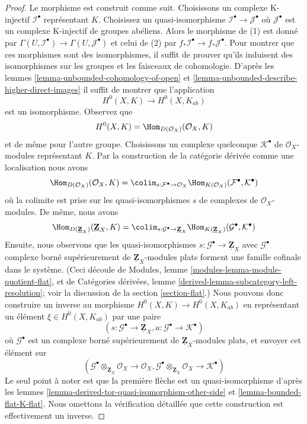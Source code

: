 \begin{proof}

Le morphisme est construit comme suit. Choisissons un complexe K-injectif
$\mathcal{I}^\bullet$ représentant $K$. Choisissez un quasi-isomorphisme
$\mathcal{I}^\bullet \to \mathcal{J}^\bullet$ où $\mathcal{J}^\bullet$
est un complexe K-injectif de groupes abéliens. Alors le morphisme de (1) est donné par $\Gamma(U, \mathcal{I}^\bullet) \to \Gamma(U, \mathcal{J}^\bullet)$
et celui de (2) par
$f_*\mathcal{I}^\bullet \to f_*\mathcal{J}^\bullet$. Pour montrer que ces morphismes sont des isomorphismes, il suffit de prouver qu'ils induisent des isomorphismes sur les groupes et les faisceaux de cohomologie. D'après les lemmes \ref{lemma-unbounded-cohomology-of-open} et
\ref{lemma-unbounded-describe-higher-direct-images}
il suffit de montrer que l'application
$$
H^0(X, K) \longrightarrow H^0(X, K_{ab})
$$
est un isomorphisme. Observez que
$$
H^0(X, K) = \Hom_{D(\mathcal{O}_X)}(\mathcal{O}_X, K)
$$
et de même pour l'autre groupe. Choisissons un complexe quelconque $\mathcal{K}^\bullet$
de $\mathcal{O}_X$-modules représentant $K$. Par la construction de la catégorie dérivée comme une localisation nous avons
$$
\Hom_{D(\mathcal{O}_X)}(\mathcal{O}_X, K) =
\colim_{s : \mathcal{F}^\bullet \to \mathcal{O}_X}
\Hom_{K(\mathcal{O}_X)}(\mathcal{F}^\bullet, \mathcal{K}^\bullet)
$$
où la colimite est prise sur les quasi-isomorphismes $s$ de complexes de
$\mathcal{O}_X$-modules. De même, nous avons
$$
\Hom_{D(\underline{\mathbf{Z}}_X)}(\underline{\mathbf{Z}}_X, K) =
\colim_{s : \mathcal{G}^\bullet \to \underline{\mathbf{Z}}_X}
\Hom_{K(\underline{\mathbf{Z}}_X)}(\mathcal{G}^\bullet, \mathcal{K}^\bullet)
$$
Ensuite, nous observons que les quasi-isomorphismes
$s : \mathcal{G}^\bullet \to \underline{\mathbf{Z}}_X$
avec $\mathcal{G}^\bullet$ complexe borné supérieurement de
$\underline{\mathbf{Z}}_X$-modules plats forment une famille cofinale dans le système. (Ceci découle de Modules, lemme \ref{modules-lemma-module-quotient-flat}, et de Catégories dérivées, lemme \ref{derived-lemma-subcategory-left-resolution}; voir la discussion de la section \ref{section-flat}.) Nous pouvons donc construire un inverse au morphisme
$H^0(X, K) \longrightarrow H^0(X, K_{ab})$
en représentant un élément $\xi \in H^0(X, K_{ab})$ par une paire
$$
(s : \mathcal{G}^\bullet \to \underline{\mathbf{Z}}_X,
a : \mathcal{G}^\bullet \to \mathcal{K}^\bullet)
$$
où $\mathcal{G}^\bullet$ est un complexe borné supérieurement de
$\underline{\mathbf{Z}}_X$-modules plats, et envoyer cet élément sur
$$
(\mathcal{G}^\bullet \otimes_{\underline{\mathbf{Z}}_X} \mathcal{O}_X
\to \mathcal{O}_X,
\mathcal{G}^\bullet  \otimes_{\underline{\mathbf{Z}}_X} \mathcal{O}_X
\to \mathcal{K}^\bullet)
$$
Le seul point à noter est que la première flèche est un quasi-isomorphisme d'après les lemmes \ref{lemma-derived-tor-quasi-isomorphism-other-side} et
\ref{lemma-bounded-flat-K-flat}. Nous omettons la vérification détaillée que cette construction est effectivement un inverse.

\end{proof}

